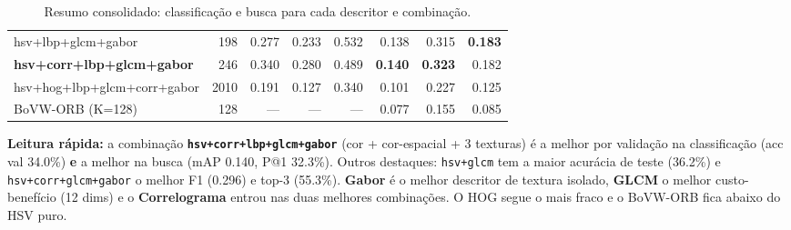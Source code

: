 \documentclass[12pt, a4paper]{article}
\begin{document}
\begin{table}[H]
\begin{tabularx}{\textwidth}{X r r r r r r r}
hsv+lbp+glcm+gabor               & 198  & 0.277          & 0.233          & 0.532          & 0.138          & 0.315          & \textbf{0.183} \\
\textbf{hsv+corr+lbp+glcm+gabor} & 246  & 0.340          & 0.280          & 0.489          & \textbf{0.140} & \textbf{0.323} & 0.182          \\
hsv+hog+lbp+glcm+corr+gabor      & 2010 & 0.191          & 0.127          & 0.340          & 0.101          & 0.227          & 0.125          \\
BoVW-ORB (K=128)                 & 128  & ---            & ---            & ---            & 0.077          & 0.155          & 0.085          \\
\bottomrule
\end{tabularx}
\caption{Resumo consolidado: classificação e busca para cada descritor e combinação.}
\end{table}

\textbf{Leitura rápida:} a combinação \textbf{\texttt{hsv+corr+lbp+glcm+gabor}} (cor + cor-espacial + 3 texturas) é a melhor por validação na classificação (acc val 34.0\%) \textbf{e} a melhor na busca (mAP 0.140, P@1 32.3\%). Outros destaques: \texttt{hsv+glcm} tem a maior acurácia de teste (36.2\%) e \texttt{hsv+corr+glcm+gabor} o melhor F1 (0.296) e top-3 (55.3\%). \textbf{Gabor} é o melhor descritor de textura isolado, \textbf{GLCM} o melhor custo-benefício (12 dims) e o \textbf{Correlograma} entrou nas duas melhores combinações. O HOG segue o mais fraco e o BoVW-ORB fica abaixo do HSV puro.

\newpage
\end{document}
